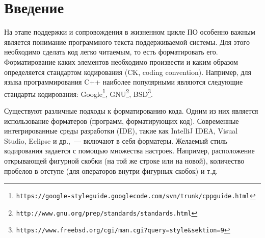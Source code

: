 \documentclass[conference]{IEEEtran}
\begin{document}
\section{Введение}






На этапе поддержки и сопровождения в жизненном цикле ПО особенно важным является понимание программного текста поддерживаемой системы. 
Для этого необходимо сделать код легко читаемым, то есть форматировать его.
Форматирование каких элементов необходимо произвести и каким образом определяется стандартом кодирования (CK, coding convention).
Например, для языка программирования C++ наиболее популярными являются следующие стандарты кодирования: Google\footnote{\texttt{https://google-styleguide.googlecode.com/svn/trunk/cppguide.html}}, GNU\footnote{\texttt{http://www.gnu.org/prep/standards/standards.html}}, BSD\footnote{\texttt{https://www.freebsd.org/cgi/man.cgi?query=style\&sektion=9}}.

Существуют различные подходы к форматированию кода. Одним из них является использование форматеров (программ, форматирующих код).
Современные интегрированные среды разработки (IDE), такие как IntelliJ IDEA, Visual Studio, Eclipse и др.,~--- включают в себя форматеры.
Желаемый стиль кодирования задается с помощью множества настроек. Например, расположение открывающей фигурной скобки (на той же строке или на новой), количество пробелов в отступе (для операторов внутри фигурных скобок) и т.д.
\end{document}
